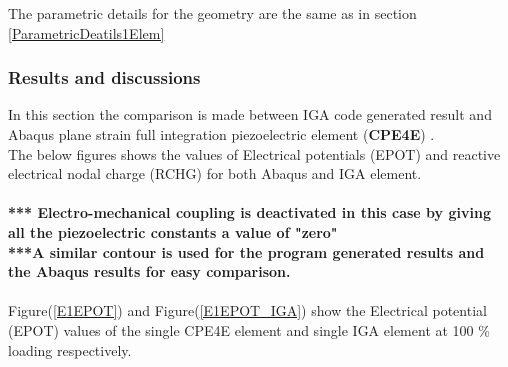 \documentclass[11pt]{article}
\begin{document}
The parametric details for the geometry are the same as in section \hyperref[ParametricDeatils1Elem]{\ref{ParametricDeatils1Elem}}

\subsubsection{Results and discussions}
In this section the comparison is made between IGA code generated result and Abaqus plane strain full integration piezoelectric element (\textbf{CPE4E}) \cite{abaqus10version}.\\The below figures shows the values of Electrical potentials (EPOT) and reactive electrical nodal charge (RCHG) for both Abaqus and IGA element.\\
\\\textbf{*** Electro-mechanical coupling is deactivated in this case by giving all the piezoelectric constants a value of "zero"  }
\\
\textbf{***A similar contour is used for the program generated results and the Abaqus results for easy comparison. }\\
\\
Figure(\ref{E1EPOT}) and Figure(\ref{E1EPOT_IGA}) show the Electrical potential (EPOT) values of the single CPE4E element and single IGA element at 100 \% loading respectively. \\
\end{document}
